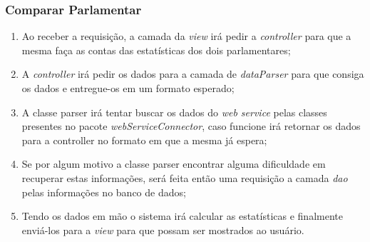 	\subsubsection{Comparar Parlamentar}

		\begin{enumerate}
			\item Ao receber a requisição, a camada da \textit{view} irá pedir a \textit{controller} para que a mesma faça as contas das estatísticas dos dois parlamentares;

			\item A \textit{controller} irá pedir os dados para a camada de \textit{dataParser} para que consiga os dados e entregue-os em um formato esperado;

			\item A classe parser irá tentar buscar os dados do \textit{web service} pelas classes presentes no pacote \textit{webServiceConnector}, caso funcione irá retornar os dados para a controller no formato em que a mesma já espera;

			\item Se por algum motivo a classe parser encontrar alguma dificuldade em recuperar estas informações, será feita então uma requisição a camada \textit{dao} pelas informações no banco de dados;

			\item Tendo os dados em mão o sistema irá calcular as estatísticas e finalmente enviá-los para a \textit{view} para que possam ser mostrados ao usuário.
		\end{enumerate}